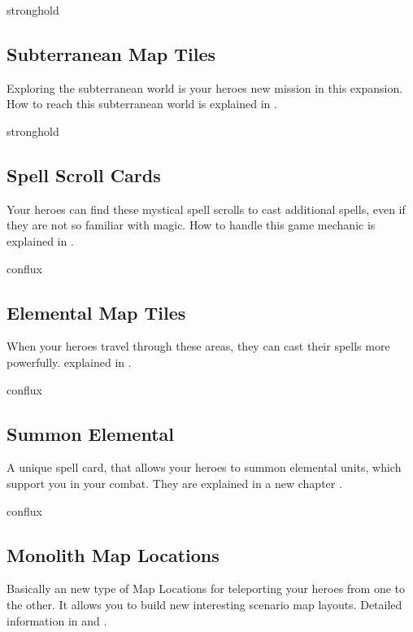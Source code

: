 \begin{multicols*}{2}
\vspace*{1em}
\begin{expansion}{stronghold}
	\subsection*{Subterranean Map Tiles}
	Exploring the subterranean world is your heroes new mission in this expansion. How to reach this subterranean world is explained in .
\end{expansion}

\vspace*{1em}
\begin{expansion}{stronghold}
	\subsection*{Spell Scroll Cards}
	Your heroes can find these mystical spell scrolls to cast additional spells, even if they are not so familiar with magic. How to handle this game mechanic is explained in .
\end{expansion}

\vspace*{1em}
\begin{expansion}{conflux}
	\subsection*{Elemental Map Tiles}
	When your heroes travel through these areas, they can cast their spells more powerfully. explained in .
\end{expansion}

\vspace*{1em}
\begin{expansion}{conflux}
	\subsection*{Summon Elemental}
	A unique spell card, that allows your heroes to summon elemental units, which support you in your combat. 
	They are explained in a new chapter .
\end{expansion}

\vspace*{1em}
\begin{expansion}{conflux}
	\subsection*{Monolith Map Locations}
	Basically an new type of Map Locations for teleporting your heroes from one to the other. 
	It allows you to build new interesting scenario map layouts. Detailed information in  and .
\end{expansion}


\end{multicols*}
